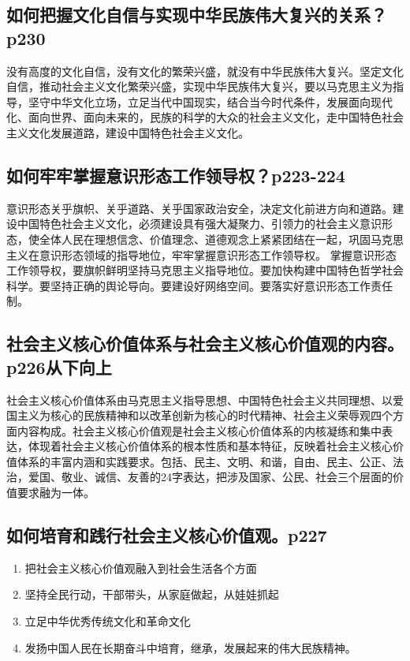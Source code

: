 \documentclass[UTF8]{ctexart}
\begin{document}
\subsection{如何把握文化自信与实现中华民族伟大复兴的关系？p230}
没有高度的文化自信，没有文化的繁荣兴盛，就没有中华民族伟大复兴。坚定文化自信，推动社会主义文化繁荣兴盛，实现中华民族伟大复兴，要以马克思主义为指导，坚守中华文化立场，立足当代中国现实，结合当今时代条件，发展面向现代化、面向世界、面向未来的，民族的科学的大众的社会主义文化，走中国特色社会主义文化发展道路，建设中国特色社会主义文化。
\subsection{如何牢牢掌握意识形态工作领导权？p223-224}
意识形态关乎旗帜、关乎道路、关乎国家政治安全，决定文化前进方向和道路。建设中国特色社会主义文化，必须建设具有强大凝聚力、引领力的社会主义意识形态，使全体人民在理想信念、价值理念、道德观念上紧紧团结在一起，巩固马克思主义在意识形态领域的指导地位，牢牢掌握意识形态工作领导权。
掌握意识形态工作领导权，要旗帜鲜明坚持马克思主义指导地位。要加快构建中国特色哲学社会科学。要坚持正确的舆论导向。要建设好网络空间。要落实好意识形态工作责任制。

\subsection{社会主义核心价值体系与社会主义核心价值观的内容。p226从下向上}
社会主义核心价值体系由马克思主义指导思想、中国特色社会主义共同理想、以爱国主义为核心的民族精神和以改革创新为核心的时代精神、社会主义荣辱观四个方面内容构成。社会主义核心价值观是社会主义核心价值体系的内核凝练和集中表达，体现着社会主义核心价值体系的根本性质和基本特征，反映着社会主义核心价值体系的丰富内涵和实践要求。包括、民主、文明、和谐，自由、民主、公正、法治，爱国、敬业、诚信、友善的24字表达，把涉及国家、公民、社会三个层面的价值要求融为一体。
\subsection{如何培育和践行社会主义核心价值观。p227}
\begin{enumerate}[(1)]
    \item 把社会主义核心价值观融入到社会生活各个方面
    \item 坚持全民行动，干部带头，从家庭做起，从娃娃抓起
    \item 立足中华优秀传统文化和革命文化
    \item 发扬中国人民在长期奋斗中培育，继承，发展起来的伟大民族精神。
\end{enumerate}
\end{document}
